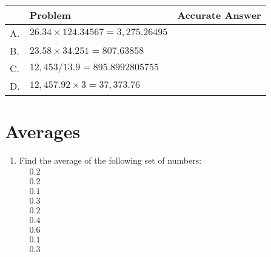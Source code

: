 \documentclass{article}
\begin{document}
\begin{tabular}{|l|l|l|}
\hline
 & Problem & Accurate Answer \\
\hline
A. & $26.34 \times 124.34567=3,275.26495$ &  \\
\hline
B. & $23.58 \times 34.251=807.63858$ &  \\
\hline
C. & $12,453 / 13.9=895.8992805755$ &  \\
\hline
D. & $12,457.92 \times 3=37,373.76$ &  \\
\hline
\end{tabular}

\section{Averages}
\begin{enumerate}
\item Find the average of the following set of numbers:\\
$
\begin{aligned}
&0.2 \\
&0.2 \\
&0.1 \\
&0.3 \\
&0.2 \\
&0.4 \\
&0.6 \\
&0.1 \\
&0.3
\end{aligned}
$
\end{enumerate}
\end{document}
